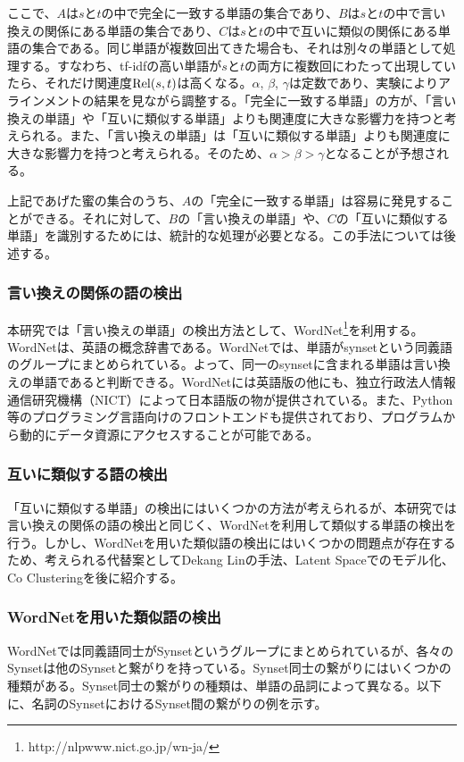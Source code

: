\documentclass[12pt]{jarticle}
\begin{document}
ここで、$A$は$s$と$t$の中で完全に一致する単語の集合であり、$B$は$s$と$t$の中で言い換えの関係にある単語の集合であり、$C$は$s$と$t$の中で互いに類似の関係にある単語の集合である。同じ単語が複数回出てきた場合も、それは別々の単語として処理する。すなわち、tf-idfの高い単語が$s$と$t$の両方に複数回にわたって出現していたら、それだけ関連度${\rm Rel}(s, t)$は高くなる。$\alpha$, $\beta$, $\gamma$は定数であり、実験によりアラインメントの結果を見ながら調整する。「完全に一致する単語」の方が、「言い換えの単語」や「互いに類似する単語」よりも関連度に大きな影響力を持つと考えられる。また、「言い換えの単語」は「互いに類似する単語」よりも関連度に大きな影響力を持つと考えられる。そのため、$\alpha > \beta > \gamma$となることが予想される。

上記であげた蜜の集合のうち、$A$の「完全に一致する単語」は容易に発見することができる。それに対して、$B$の「言い換えの単語」や、$C$の「互いに類似する単語」を識別するためには、統計的な処理が必要となる。この手法については後述する。

\subsubsection{言い換えの関係の語の検出}
本研究では「言い換えの単語」の検出方法として、WordNet\footnote{http://nlpwww.nict.go.jp/wn-ja/}を利用する。WordNetは、英語の概念辞書である。WordNetでは、単語がsynsetという同義語のグループにまとめられている。よって、同一のsynsetに含まれる単語は言い換えの単語であると判断できる。WordNetには英語版の他にも、独立行政法人情報通信研究機構（NICT）によって日本語版の物が提供されている。また、Python等のプログラミング言語向けのフロントエンドも提供されており、プログラムから動的にデータ資源にアクセスすることが可能である。

\subsubsection{互いに類似する語の検出}
「互いに類似する単語」の検出にはいくつかの方法が考えられるが、本研究では言い換えの関係の語の検出と同じく、WordNetを利用して類似する単語の検出を行う。しかし、WordNetを用いた類似語の検出にはいくつかの問題点が存在するため、考えられる代替案としてDekang Linの手法\cite{DekangLin}、Latent Spaceでのモデル化\cite{LatentSpace}、Co Clustering\cite{CoClustering}を後に紹介する。

\subsubsection{WordNetを用いた類似語の検出}
WordNetでは同義語同士がSynsetというグループにまとめられているが、各々のSynsetは他のSynsetと繋がりを持っている。Synset同士の繋がりにはいくつかの種類がある。Synset同士の繋がりの種類は、単語の品詞によって異なる。以下に、名詞のSynsetにおけるSynset間の繋がりの例を示す。
\end{document}
